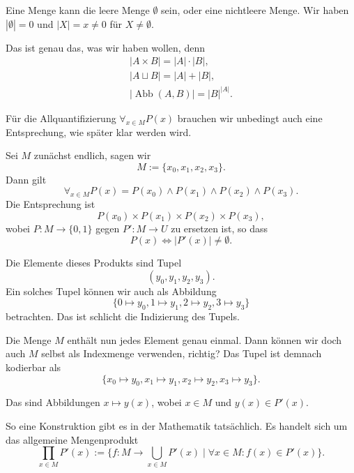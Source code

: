 \documentclass[9pt]{beamer}
\newcommand{\Abb}{\operatorname{Abb}}
\begin{document}
\begin{frame}
Eine Menge kann die leere Menge $\emptyset$ sein, oder eine
nichtleere Menge. Wir haben $|\emptyset|=0$ und
$|X|=x\ne 0$ für $X\ne\emptyset$.\pause

\vspace{1em}
Das ist genau das, was wir haben wollen, denn
\begin{gather*}
|A\times B| = |A|\cdot |B|,\\
|A\sqcup B| = |A| + |B|,\\
|\Abb(A,B)| = |B|^{|A|}.
\end{gather*}
\end{frame}

\begin{frame}
Für die Allquantifizierung $\forall_{x\in M}P(x)$ brauchen wir
unbedingt auch eine Entsprechung, wie später klar werden wird.\pause

\vspace{1em}
Sei $M$ zunächst endlich, sagen wir
\[M:=\{x_0,x_1,x_2,x_3\}.\]
Dann gilt
\[\forall_{x\in M}P(x) = P(x_0)\land P(x_1)\land P(x_2)\land P(x_3).
\]\pause
Die Entsprechung ist
\[P(x_0)\times P(x_1)\times P(x_2)\times P(x_3),\]
wobei $P\colon M\to\{0,1\}$ gegen $P'\colon M\to U$
zu ersetzen ist, so dass
\[P(x)\iff |P'(x)|\ne\emptyset.\]
\end{frame}

\begin{frame}
Die Elemente dieses Produkts sind Tupel
\[(y_0, y_1, y_2, y_3).\]\pause
Ein solches Tupel können wir auch als Abbildung
\[\{0\mapsto y_0, 1\mapsto y_1, 2\mapsto y_2, 3\mapsto y_3\}\]
betrachten. Das ist schlicht die Indizierung des Tupels.\pause

\vspace{1em}
Die Menge $M$ enthält nun jedes Element genau einmal.
Dann können wir doch auch $M$ selbst als Indexmenge verwenden,
richtig? Das Tupel ist demnach kodierbar als
\[\{x_0\mapsto y_0, x_1\mapsto y_1, x_2\mapsto y_2, x_3\mapsto y_3\}.\]
\end{frame}

\begin{frame}
Das sind Abbildungen $x\mapsto y(x)$, wobei $x\in M$
und $y(x)\in P'(x)$.\pause

\vspace{1em}
So eine Konstruktion gibt es in der Mathematik tatsächlich.
Es handelt sich um das allgemeine Mengenprodukt
\[\prod_{x\in M} P'(x) := \{f\colon M\to \bigcup_{x\in M}P'(x)\mid \forall x\in M\colon f(x)\in P'(x)\}.\]
\end{frame}
\end{document}
